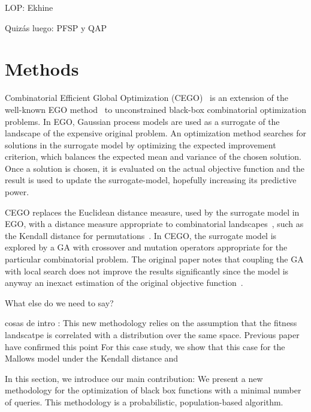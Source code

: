 \documentclass[runningheads]{llncs}
\begin{document}
LOP: Ekhine

Quizás luego: PFSP y QAP

\section{Methods}



Combinatorial Efficient Global Optimization
(CEGO)~\citep{ZaeStoFriFisNauBar2014} is an extension of the well-known EGO
method~\citep{JonSchWel98go} to unconstrained black-box combinatorial
optimization problems. In EGO, Gaussian process models are used as a surrogate
of the landscape of the expensive original problem. An optimization method
searches for solutions in the surrogate model by optimizing the expected
improvement criterion, which balances the expected mean and variance of the
chosen solution. Once a solution is chosen, it is evaluated on the actual
objective function and the result is used to update the surrogate-model,
hopefully increasing its predictive power.

CEGO replaces the Euclidean distance measure, used by the surrogate model in
EGO, with a distance measure appropriate to combinatorial
landscapes~\citep{ZaeStoBar2014:ppsn}, such as the Kendall distance for
permutations~\citep{?}. In CEGO, the surrogate model is explored by a GA with
crossover and mutation operators appropriate for the particular combinatorial
problem. The original paper notes that coupling the GA with local search does
not improve the results significantly since the model is anyway an inexact
estimation of the original objective
function~\citep[p.~875]{ZaeStoFriFisNauBar2014}.

What else do we need to say?

\newcommand{\minit}{\ensuremath{m_\text{ini}}\xspace}

\newcommand{\FEmax}{\ensuremath{\textit{FE}_{\max}}}

cosas de intro : 
This new methodology relies on the assumption that the fitness landscatpe is correlated with a distribution over the same space. 
Previous paper have confirmed this point
For this case study, we show that this case for the Mallows model under the Kendall distance and 



In this section, we introduce our main contribution: We present a new methodology for the optimization of black box functions with a minimal number of queries. This methodology is a probabilistic, population-based algorithm. 
\end{document}
